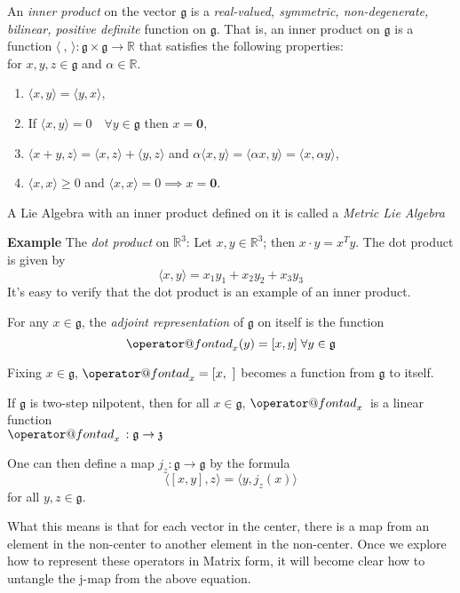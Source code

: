 \documentclass[11 pt]{article}
\makeatletter
\renewcommand{\a}{\alpha}
\newcommand{\br}[2]{\left[#1,#2\right]}
\newcommand{\inp}[2]{\langle #1, #2 \rangle}
\newcommand{\inpe}{\inp{\ }{\,}}
\newcommand{\lag}[1]{\mathfrak{#1}}
\newcommand{\R}{\mathbb{R}}
\newcommand{\fg}{\mathfrak{g}}
\newcommand{\fz}{\mathfrak{z}}
\newcommand{\zvec}{\mathbf{0}}
\newcommand{\RR}{\mathbb{R}}
\newcommand{\ad}[1]{\mathop{\operator@font ad}\nolimits_{#1}}
\makeatother
\begin{document}
\begin{definition}
    An \emph{inner product} on the vector $\fg$ is a
    \emph{real-valued, symmetric, non-degenerate, bilinear, positive definite}
    function on $\fg$.  That is, an inner product on $\fg$ is a function
    $\inpe:\fg\times\fg\to\RR$ that satisfies the
    following properties:
    \\for $x,y,z \in \fg$ and $\a \in \RR$.
    \begin{enumerate}
        \item $\langle x,y \rangle = \langle y,x \rangle$,
        \item If $\langle x,y \rangle = 0 \quad \forall y \in \fg$
            then $x = \zvec$,
        \item
            $\langle x+y,z \rangle = \langle x,z \rangle + \langle y,z \rangle$
            and $\a \langle x,y \rangle = \langle \a x,y \rangle
            = \langle x,\a y \rangle$,
        \item $\langle x,x \rangle \geq 0$
            and $\langle x,x\rangle = 0 \implies x=\zvec$.
    \end{enumerate}
    A Lie Algebra with an inner product defined on it is called a
    \emph{Metric Lie Algebra}
\end{definition}
{\bf Example} The \emph{dot product} on $\R^3$:
Let $x, y \in \R^3$; then $x \cdot y = x^Ty$.  The dot product is given by
\[
    \langle x,y \rangle =  x_1y_1 + x_2y_2 + x_3y_3
\]
It's easy to verify that the dot product is an example of an inner product.

\begin{definition}
    For any $x \in \fg$, the \emph{adjoint representation} of $\fg$ on itself is
    the function
    \[
        \ad{x}(y) = [x,y] \; \forall y \in \fg
    \]
\end{definition}

Fixing $x \in \lag{g}$, $\ad{x} = \br{x}{\ }$ becomes a function from
$\lag{g}$ to itself.

If $\fg$ is two-step nilpotent, then for all $x \in \fg$, $\ad{x}{}$ is a
linear function
\\$\ad{x}{}: \fg \to \fz$

\begin{definition}
    One can then define a map $j_z :\lag{g} \to \lag{g}$ by the formula
    \[
    \langle\br{x}{y},z\rangle = \langle y,j_z(x)\rangle
    \]
    for all $y, z \in \lag{g}$.
\end{definition}

What this means is that for each vector in the center, there is a map from an
element in the non-center to another element in the non-center.  Once we
explore how to represent these operators in Matrix form, it will become clear
how to untangle the j-map from the above equation.
\end{document}
